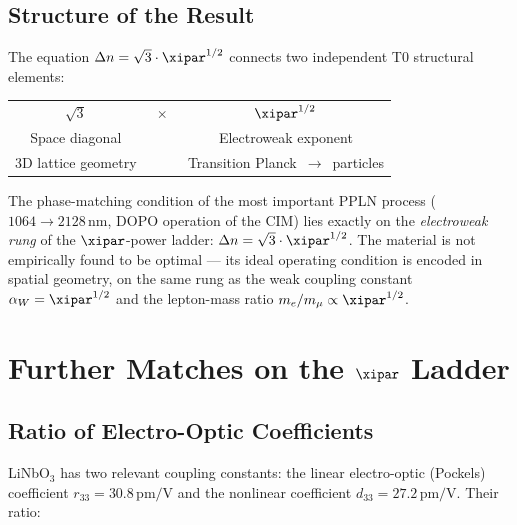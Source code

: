 \subsection{Structure of the Result}

The equation $\Delta n = \sqrt{3}\cdot\xipar^{1/2}$ connects two independent
T0 structural elements:

\begin{center}
\renewcommand{\arraystretch}{1.5}
\begin{tabular}{ccc}
    $\sqrt{3}$ & $\;\times\;$ & $\xipar^{1/2}$ \\[2pt]
    Space diagonal & & Electroweak exponent \\
    3D lattice geometry & & Transition Planck~$\to$~particles \\
\end{tabular}
\end{center}

\begin{important}
The phase-matching condition of the most important PPLN process
($1064 \to 2128\,\text{nm}$, DOPO operation of the CIM) lies exactly on
the \emph{electroweak rung} of the $\xipar$-power ladder:
$\Delta n = \sqrt{3}\cdot\xipar^{1/2}$. The material is not empirically
found to be optimal — its ideal operating condition is encoded in spatial
geometry, on the same rung as the weak coupling constant
$\alpha_W = \xipar^{1/2}$ and the lepton-mass ratio $m_e/m_\mu \propto
\xipar^{1/2}$.
\end{important}

\clearpage

\section{Further Matches on the \texorpdfstring{$\xipar$}{xi} Ladder}
\label{sec:further}

\subsection{Ratio of Electro-Optic Coefficients}

LiNbO$_3$ has two relevant coupling constants: the linear electro-optic
(Pockels) coefficient $r_{33} = 30.8\,\text{pm/V}$ and the nonlinear
coefficient $d_{33} = 27.2\,\text{pm/V}$.  Their ratio:

